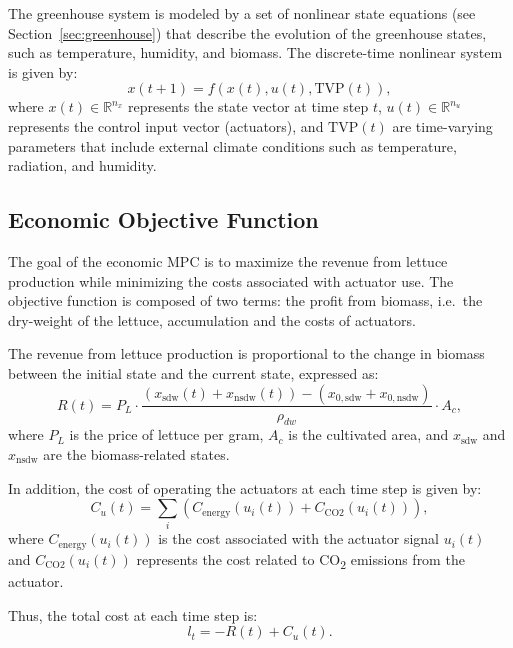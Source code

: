 \documentclass[conference]{IEEEtran}
\begin{document}
The greenhouse system is modeled by a set of nonlinear state equations (see Section~\ref{sec:greenhouse}) that describe the evolution of the greenhouse states, such as temperature, humidity, and biomass. The discrete-time nonlinear system is given by:
\begin{equation}
	x(t+1) = f\left( x(t), u(t), \text{TVP}(t) \right),
\end{equation}
where \(x(t) \in \mathbb{R}^{n_x}\) represents the state vector at time step \(t\), \(u(t) \in \mathbb{R}^{n_u}\) represents the control input vector (actuators), and \(\text{TVP}(t)\) are time-varying parameters that include external climate conditions such as temperature, radiation, and humidity.

\subsection{Economic Objective Function}\label{subsec:mpc_objective}

The goal of the economic MPC is to maximize the revenue from lettuce production while minimizing the costs associated with actuator use. The objective function is composed of two terms: the profit from biomass, i.e.~the dry-weight of the lettuce, accumulation and the costs of actuators.

The revenue from lettuce production is proportional to the change in biomass between the initial state and the current state, expressed as:
\begin{equation}
	R(t) = P_L \cdot \frac{(x_{\mathrm{sdw}}(t) + x_{\mathrm{nsdw}}(t)) - (x_{0, \mathrm{sdw}} + x_{0, \mathrm{nsdw} })}{\rho_{dw}} \cdot A_c,
\end{equation}
where \(P_L\) is the price of lettuce per gram, \(A_c\) is the cultivated area, and \(x_{\mathrm{sdw}}\) and \(x_{\mathrm{nsdw}}\) are the biomass-related states.

In addition, the cost of operating the actuators at each time step is given by:
\begin{equation}
	C_u(t) = \sum_{i} \left( C_{\text{energy}}(u_i(t)) + C_{\text{CO2}}(u_i(t)) \right),
\end{equation}
where \(C_{\text{energy}}(u_i(t))\) is the cost associated with the actuator signal \(u_i(t)\) and \(C_{\text{CO2}}(u_i(t))\) represents the cost related to CO\textsubscript{2} emissions from the actuator.

Thus, the total cost at each time step is:
\begin{equation}
	l_t = -R(t) + C_u(t).
\end{equation}
\end{document}
